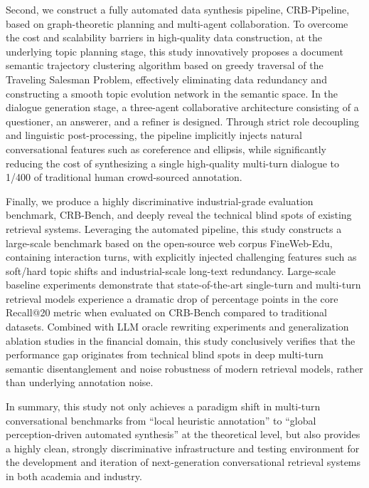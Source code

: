 Second, we construct a fully automated data synthesis pipeline, CRB-Pipeline, based on graph-theoretic planning and multi-agent collaboration. To overcome the cost and scalability barriers in high-quality data construction, at the underlying topic planning stage, this study innovatively proposes a document semantic trajectory clustering algorithm based on greedy traversal of the Traveling Salesman Problem, effectively eliminating data redundancy and constructing a smooth topic evolution network in the semantic space. In the dialogue generation stage, a three-agent collaborative architecture consisting of a questioner, an answerer, and a refiner is designed. Through strict role decoupling and linguistic post-processing, the pipeline implicitly injects natural conversational features such as coreference and ellipsis, while significantly reducing the cost of synthesizing a single high-quality multi-turn dialogue to 1/400 of traditional human crowd-sourced annotation.

Finally, we produce a highly discriminative industrial-grade evaluation benchmark, CRB-Bench, and deeply reveal the technical blind spots of existing retrieval systems. Leveraging the automated pipeline, this study constructs a large-scale benchmark based on the open-source web corpus FineWeb-Edu, containing  interaction turns, with explicitly injected challenging features such as soft/hard topic shifts and industrial-scale long-text redundancy. Large-scale baseline experiments demonstrate that state-of-the-art single-turn and multi-turn retrieval models experience a dramatic drop of  percentage points in the core Recall@20 metric when evaluated on CRB-Bench compared to traditional datasets. Combined with LLM oracle rewriting experiments and generalization ablation studies in the financial domain, this study conclusively verifies that the performance gap originates from technical blind spots in deep multi-turn semantic disentanglement and noise robustness of modern retrieval models, rather than underlying annotation noise.

In summary, this study not only achieves a paradigm shift in multi-turn conversational benchmarks from “local heuristic annotation” to “global perception-driven automated synthesis” at the theoretical level, but also provides a highly clean, strongly discriminative infrastructure and testing environment for the development and iteration of next-generation conversational retrieval systems in both academia and industry.


% 


